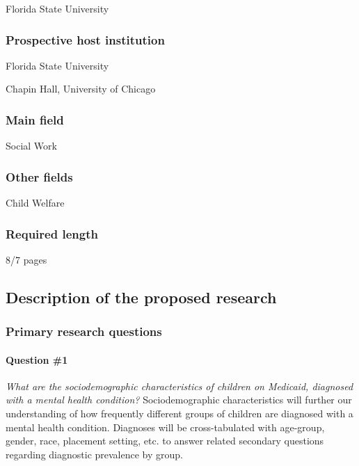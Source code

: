 \documentclass[twocolumn, issue, rga, authordate]{jote-new-article}
\begin{document}
Florida State University


\subsubsection{Prospective host institution}


Florida State University

\noindent Chapin Hall, University of Chicago


\subsubsection{Main field}


Social Work


\subsubsection{Other fields}


Child Welfare


\subsubsection{Required length}


8/7 pages






\subsection{Description of the proposed research}



\subsubsection{Primary research questions}


\paragraph{Question \#1} \emph{What are the sociodemographic
characteristics of children on Medicaid, diagnosed with a mental health
condition?} Sociodemographic characteristics will further our
understanding of how frequently different groups of children are
diagnosed with a mental health condition. Diagnoses will be
cross-tabulated with age-group, gender, race, placement setting, etc. to
answer related secondary questions regarding diagnostic prevalence by
group.
\end{document}
